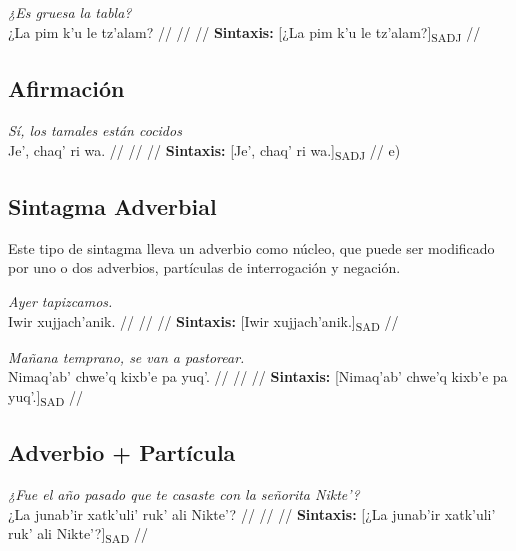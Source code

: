 \documentclass{article}%
\begin{document}
%
\par\medskip%
\ex
\textit{¿Es gruesa la tabla?} \\
\begingl
\gla ¿La pim k'u le tz'alam? //
\glb  //
\glc  //
\glft \textbf{Sintaxis:} [¿La pim k'u le tz'alam?]\textsubscript{SADJ} //
\endgl
\xe
%
\medskip%
\subsection{Afirmación}%
\label{subsec:Afirmacin}%

%
\par\medskip%
\ex
\textit{Sí, los tamales están cocidos} \\
\begingl
\gla Je', chaq' ri wa. //
\glb  //
\glc  //
\glft \textbf{Sintaxis:} [Je', chaq' ri wa.]\textsubscript{SADJ} //
\endgl
\xe
%
\medskip%
e) %
\subsection{Sintagma Adverbial}%
\label{subsec:SintagmaAdverbial}%

%
Este tipo de sintagma lleva un adverbio como núcleo, que puede ser modificado por uno %
o dos adverbios, partículas de interrogación y negación. %
\par\medskip%
\ex
\textit{Ayer tapizcamos.} \\
\begingl
\gla Iwir xujjach'anik. //
\glb  //
\glc  //
\glft \textbf{Sintaxis:} [Iwir xujjach'anik.]\textsubscript{SAD} //
\endgl
\xe
%
\medskip%
\par\medskip%
\ex
\textit{Mañana temprano, se van a pastorear.} \\
\begingl
\gla Nimaq'ab' chwe'q kixb'e pa yuq'. //
\glb  //
\glc  //
\glft \textbf{Sintaxis:} [Nimaq'ab' chwe'q kixb'e pa yuq'.]\textsubscript{SAD} //
\endgl
\xe
%
\medskip%
\subsection{Adverbio + Partícula}%
\label{subsec:Adverbio+Partcula}%

%
\par\medskip%
\ex
\textit{¿Fue el año pasado que te casaste con la señorita Nikte'?} \\
\begingl
\gla ¿La junab'ir xatk'uli' ruk' ali Nikte'? //
\glb  //
\glc  //
\glft \textbf{Sintaxis:} [¿La junab'ir xatk'uli' ruk' ali Nikte'?]\textsubscript{SAD} //
\endgl
\xe
%
\medskip

%
\end{document}
